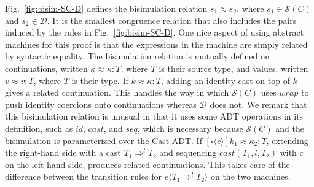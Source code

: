 \documentclass[acmsmall,review]{acmart}\settopmatter{printfolios=true,printccs=false,printacmref=false}
\newcommand{\kOOcast}[2]{
  [\square \langle #1 \rangle]#2}
\newcommand{\ineffCEKD}{\ensuremath{\mathcal{D}}}
\newcommand{\effCEK}[1]{\ensuremath{\mathcal{S}(#1)}}
\begin{document}


Fig.~\ref{fig:bisim-SC-D} defines the bisimulation relation
$s_1 \approx s_2$, where $s_1 \in \effCEK{C}$ and $s_2 \in \ineffCEKD{}$.
It is the smallest congruence relation that also includes the
pairs induced by the rules in Fig.~\ref{fig:bisim-SC-D}.
%
One nice aspect of using abstract machines for this proof is that
the expressions in the machine are simply related by syntactic equality.
%
The bisimulation relation is mutually defined on continuations, written $\kappa
\approx \kappa : T$, where $T$ is their source type, and values, written $v 
\approx v : T$, where $T$ is their type.
%
If $k \approx \kappa : T$, adding an identity cast on top of $k$ gives a 
related continuation. This handles the way in which
\effCEK{C} uses $wrap$ to push identity coercions onto continuations
whereas \ineffCEKD{} does not.
%
We remark that this bisimulation relation is unusual in that it uses
some ADT operations in its definition, such as $id$, $cast$, and
$seq$, which is necessary because \effCEK{C} and the bisimulation
is parameterized over the Cast ADT.
%
%
If $\kOOcast{c}{k_1} \approx \kappa_2 : T$, extending the right-hand
side with a cast $T_1 \Rightarrow^l T_2$ and sequencing
$cast(T_1,l,T_2)$ with $c$ on the left-hand side, produces related
continuations. This takes care of the difference between
the transition rules for $e \langle T_1 \Rightarrow^l T_2 \rangle$
on the two machines.
\end{document}
